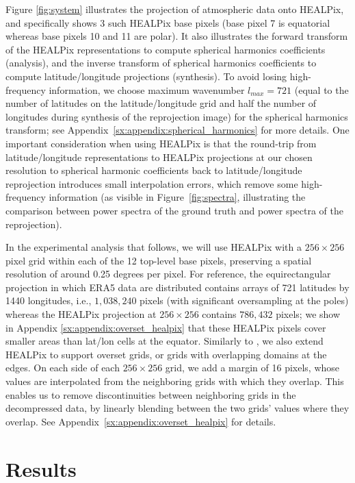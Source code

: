 \documentclass[11pt, a4paper, logo, copyright, numbering]{googledeepmind}
\begin{document}
Figure \ref{fig:system} illustrates the projection of atmospheric data onto HEALPix, and specifically shows 3 such HEALPix base pixels (base pixel 7 is equatorial whereas base pixels 10 and 11 are polar). It also illustrates the forward transform of the HEALPix representations to compute spherical harmonics coefficients (analysis), and the inverse transform of spherical harmonics coefficients to compute latitude/longitude projections (synthesis). To avoid losing high-frequency information, we choose maximum wavenumber $l_{max}=721$ (equal to the number of latitudes on the latitude/longitude grid and half the number of longitudes during synthesis of the reprojection image) for the spherical harmonics transform; see Appendix~\ref{sx:appendix:spherical_harmonics} for more details. One important consideration when using HEALPix is that the round-trip from latitude/longitude representations to HEALPix projections at our chosen resolution to spherical harmonic coefficients back to latitude/longitude reprojection introduces small interpolation errors, which remove some high-frequency information (as visible in Figure~\ref{fig:spectra}, illustrating the comparison between power spectra of the ground truth and power spectra of the reprojection).

In the experimental analysis that follows, we will use HEALPix with a $256 \times 256$ pixel grid within each of the 12 top-level base pixels, preserving a spatial resolution of around 0.25 degrees per pixel. For reference, the equirectangular projection in which ERA5 data are distributed contains arrays of 721 latitudes by 1440 longitudes, i.e., $1,038,240$ pixels (with significant oversampling at the poles) whereas the HEALPix projection at $256 \times 256$ contains $786,432$ pixels; we show in Appendix \ref{sx:appendix:overset_healpix} that these HEALPix pixels cover smaller areas than lat/lon cells at the equator.
Similarly to \cite{karlbauer2023advancing}, we also extend HEALPix to support overset grids, or grids with overlapping domains at the edges. On each side of each $256 \times 256$ grid, we add a margin of 16 pixels, whose values are interpolated from the neighboring grids with which they overlap. This enables us to remove discontinuities between neighboring grids in the decompressed data, by linearly blending between the two grids' values where they overlap. See Appendix~\ref{sx:appendix:overset_healpix} for details.

 
\section{Results}
\label{sx:experiments}
\end{document}
